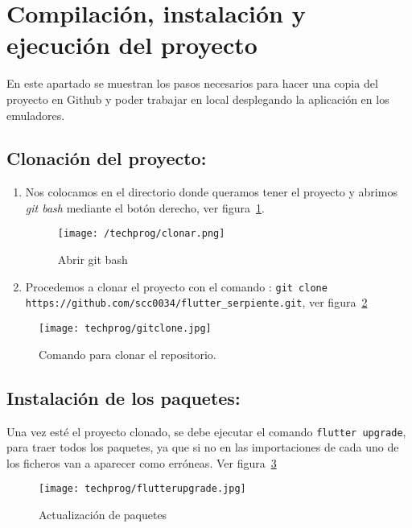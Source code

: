 \section{Compilación, instalación y ejecución del proyecto}
En este apartado se muestran los pasos necesarios para hacer una copia del proyecto en Github y poder trabajar en local desplegando la aplicación en los emuladores.

\subsection{Clonación del proyecto:}

\begin{enumerate}
	\item Nos colocamos en el directorio donde queramos tener el proyecto y abrimos \emph{git bash} mediante el botón derecho, ver figura~\ref{fig:opengitbash}.
	
	\begin{figure}%
		\centering
		\texttt{[image: /techprog/clonar.png]}
		\caption{Abrir git bash}
		\label{fig:opengitbash}
	\end{figure}

	\item Procedemos a clonar el proyecto con el comando : 
	\texttt{git clone \\https://github.com/scc0034/flutter\_serpiente.git}, ver figura~\ref{fig:git-clone}
\end{enumerate}

\begin{figure}%
	\centering
	\texttt{[image: techprog/gitclone.jpg]}
	\caption{Comando para clonar el repositorio.}\label{fig:git-clone}
\end{figure}

\subsection{Instalación de los paquetes:}
Una vez esté el proyecto clonado, se debe ejecutar el comando \texttt{flutter upgrade}, para traer todos los paquetes, ya que si no en las importaciones de cada uno de los ficheros van a aparecer como erróneas. Ver figura~\ref{fig:upgrade}
\begin{figure}%
	\centering
	\texttt{[image: techprog/flutterupgrade.jpg]}
	\caption{Actualización de paquetes}\label{fig:upgrade}
\end{figure}

